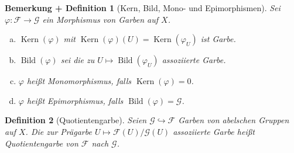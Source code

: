\documentclass[a4paper,oneside]{scrbook}
\theoremstyle{break}
\newtheorem{Def}{Definition}[section]
\newtheorem{BemDef}[Def]{Bemerkung + Definition}
\theoremstyle{nonumberbreak}
\theoremstyle{nonumberplain}
\theoremstyle{break}
\newcommand{\mono}{%
	\ensuremath{\hookrightarrow}%
}
\renewcommand{\phi}{%
	\ensuremath{\varphi}%
}
\renewcommand{\ker}{%
	\ensuremath{\operatorname{Kern}}%
}
\newcommand{\img}{%
	\ensuremath{\operatorname{Bild}}%
}
\begin{document}
\begin{BemDef}[Kern, Bild, Mono- und Epimorphismen]
	\label{def:sheaf_morphism:kern_image}
	Sei $\phi\colon \mathcal{F} \to \mathcal{G}$ ein Morphismus von Garben auf $X$.
	\begin{enumerate}[(a)]
		\item $\ker(\phi)$ mit $\ker(\phi)(U) = \ker(\phi_U)$ ist Garbe.
		\item $\img(\phi)$ sei die zu $U \mapsto \img(\phi_U)$ assoziierte Garbe.
		\item $\phi$ heißt \emph{Monomorphismus}, falls $\ker(\phi) = 0$.
		\item $\phi$ heißt \emph{Epimorphismus}, falls $\img(\phi) = \mathcal{G}$.
	\end{enumerate}
\end{BemDef}



\begin{Def}[Quotientengarbe]
	\label{def:quotient_sheaf}
	Seien $\mathcal{G} \mono \mathcal{F}$ Garben von abelschen Gruppen auf $X$. Die zur Prägarbe $U \mapsto \mathcal{F}(U) \big/ \mathcal{G}(U)$ assoziierte Garbe heißt \emph{Quotientengarbe} von $\mathcal{F}$ nach $\mathcal{G}$.
\end{Def}
\end{document}
